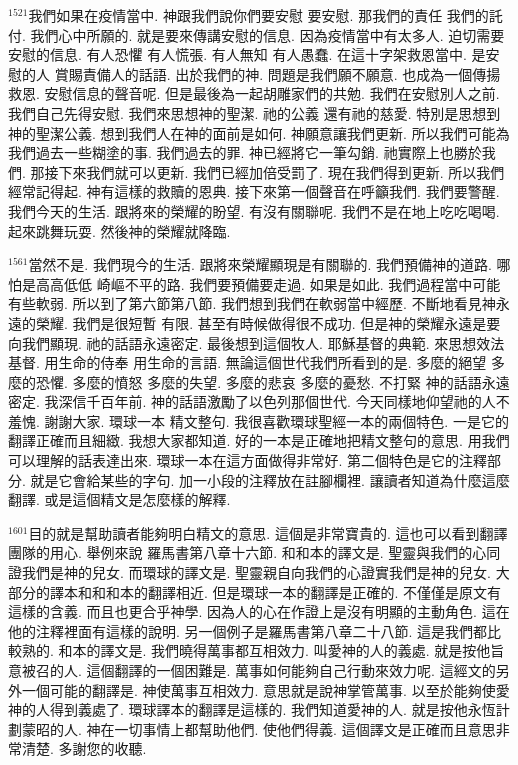 \documentclass{book}
\begin{document}
$^{1521}$我們如果在疫情當中.
神跟我們說你們要安慰 要安慰.
那我們的責任 我們的託付.
我們心中所願的.
就是要來傳講安慰的信息.
因為疫情當中有太多人.
迫切需要安慰的信息.
有人恐懼 有人慌張.
有人無知 有人愚蠢.
在這十字架救恩當中.
是安慰的人 賞賜責備人的話語.
出於我們的神.
問題是我們願不願意.
也成為一個傳揚救恩.
安慰信息的聲音呢.
但是最後為一起胡雕家們的共勉.
我們在安慰別人之前.
我們自己先得安慰.
我們來思想神的聖潔.
祂的公義 還有祂的慈愛.
特別是思想到神的聖潔公義.
想到我們人在神的面前是如何.
神願意讓我們更新.
所以我們可能為我們過去一些糊塗的事.
我們過去的罪.
神已經將它一筆勾銷.
祂實際上也勝於我們.
那接下來我們就可以更新.
我們已經加倍受罰了.
現在我們得到更新.
所以我們經常記得起.
神有這樣的救贖的恩典.
接下來第一個聲音在呼籲我們.
我們要警醒.
我們今天的生活.
跟將來的榮耀的盼望.
有沒有關聯呢.
我們不是在地上吃吃喝喝.
起來跳舞玩耍.
然後神的榮耀就降臨.

$^{1561}$當然不是.
我們現今的生活.
跟將來榮耀顯現是有關聯的.
我們預備神的道路.
哪怕是高高低低 崎嶇不平的路.
我們要預備要走過.
如果是如此.
我們過程當中可能有些軟弱.
所以到了第六節第八節.
我們想到我們在軟弱當中經歷.
不斷地看見神永遠的榮耀.
我們是很短暫 有限.
甚至有時候做得很不成功.
但是神的榮耀永遠是要向我們顯現.
祂的話語永遠密定.
最後想到這個牧人.
耶穌基督的典範.
來思想效法基督.
用生命的侍奉 用生命的言語.
無論這個世代我們所看到的是.
多麼的絕望 多麼的恐懼.
多麼的憤怒 多麼的失望.
多麼的悲哀 多麼的憂愁.
不打緊 神的話語永遠密定.
我深信千百年前.
神的話語激勵了以色列那個世代.
今天同樣地仰望祂的人不羞愧.
謝謝大家.
環球一本 精文整句.
我很喜歡環球聖經一本的兩個特色.
一是它的翻譯正確而且細緻.
我想大家都知道.
好的一本是正確地把精文整句的意思.
用我們可以理解的話表達出來.
環球一本在這方面做得非常好.
第二個特色是它的注釋部分.
就是它會給某些的字句.
加一小段的注釋放在註腳欄裡.
讓讀者知道為什麼這麼翻譯.
或是這個精文是怎麼樣的解釋.

$^{1601}$目的就是幫助讀者能夠明白精文的意思.
這個是非常寶貴的.
這也可以看到翻譯團隊的用心.
舉例來說 羅馬書第八章十六節.
和和本的譯文是.
聖靈與我們的心同證我們是神的兒女.
而環球的譯文是.
聖靈親自向我們的心證實我們是神的兒女.
大部分的譯本和和和本的翻譯相近.
但是環球一本的翻譯是正確的.
不僅僅是原文有這樣的含義.
而且也更合乎神學.
因為人的心在作證上是沒有明顯的主動角色.
這在他的注釋裡面有這樣的說明.
另一個例子是羅馬書第八章二十八節.
這是我們都比較熟的.
和本的譯文是.
我們曉得萬事都互相效力.
叫愛神的人的義處.
就是按他旨意被召的人.
這個翻譯的一個困難是.
萬事如何能夠自己行動來效力呢.
這經文的另外一個可能的翻譯是.
神使萬事互相效力.
意思就是說神掌管萬事.
以至於能夠使愛神的人得到義處了.
環球譯本的翻譯是這樣的.
我們知道愛神的人.
就是按他永恆計劃蒙昭的人.
神在一切事情上都幫助他們.
使他們得義.
這個譯文是正確而且意思非常清楚.
多謝您的收聽.
\newpage
\end{document}
